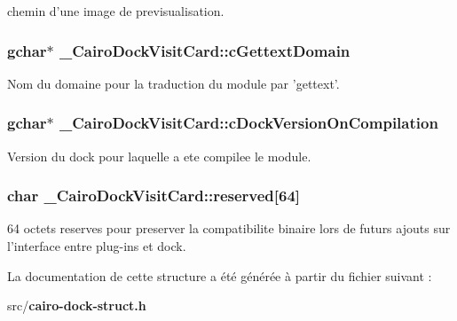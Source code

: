 chemin d'une image de previsualisation. 

\subsubsection{\setlength{\rightskip}{0pt plus 5cm}gchar$\ast$ {\bf \_\-CairoDockVisitCard::cGettextDomain}}\label{struct__CairoDockVisitCard_165ad4ec549047ad96971c7a4fc19df1}


Nom du domaine pour la traduction du module par 'gettext'. 

\subsubsection{\setlength{\rightskip}{0pt plus 5cm}gchar$\ast$ {\bf \_\-CairoDockVisitCard::cDockVersionOnCompilation}}\label{struct__CairoDockVisitCard_ce93fe5d878be17e87c9dbc2fad46ff1}


Version du dock pour laquelle a ete compilee le module. 

\subsubsection{\setlength{\rightskip}{0pt plus 5cm}char {\bf \_\-CairoDockVisitCard::reserved}[64]}\label{struct__CairoDockVisitCard_5afe50c25f0c45a14bcf5a4d6c848afc}


64 octets reserves pour preserver la compatibilite binaire lors de futurs ajouts sur l'interface entre plug-ins et dock. 



La documentation de cette structure a été générée à partir du fichier suivant :\begin{CompactItemize}
\item 
src/{\bf cairo-dock-struct.h}\end{CompactItemize}
